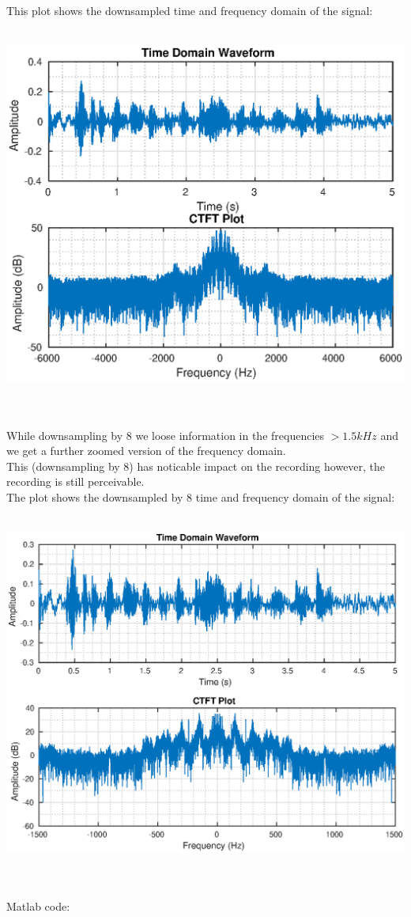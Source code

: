 \documentclass[11pt]{article}
\begin{document}
This plot shows the downsampled time and frequency domain of the signal:\\ 
\vspace{10pt}\\ 
\centerline{\includegraphics[scale = 1]{./Task2_DS2.eps}}\\
\vspace{10pt}\\ 

While downsampling by 8 we loose information in the frequencies $>1.5kHz$ and we get a further zoomed version of the frequency domain. \\
This (downsampling by 8) has noticable impact on the recording however, the recording is still perceivable.\\
\newpage
The plot shows the downsampled by 8 time and frequency domain of the signal: \\
\vspace{10pt}\\ 
\centerline{\includegraphics[scale = 1]{./Task2_DS8.eps}}\\
\vspace{10pt}\\
Matlab code:

\end{document}
